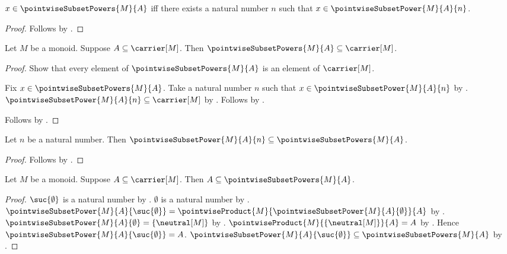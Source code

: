 \begin{proposition}\label{pointwise_subset_powers_iff}
    $x\in\pointwiseSubsetPowers{M}{A}$ iff there exists a natural number
        $n$ such that $x\in\pointwiseSubsetPower{M}{A}{n}$.
\end{proposition}
\begin{proof}
    Follows by .
\end{proof}

\begin{proposition}\label{pointwise_subset_powers_type}
    Let $M$ be a monoid.
    Suppose $A\subseteq\carrier[M]$.
    Then $\pointwiseSubsetPowers{M}{A}\subseteq\carrier[M]$.
\end{proposition}
\begin{proof}
    Show that every element of $\pointwiseSubsetPowers{M}{A}$ is an element
        of $\carrier[M]$.
    \begin{subproof}
        Fix $x\in\pointwiseSubsetPowers{M}{A}$.
        Take a natural number $n$ such that
            $x\in\pointwiseSubsetPower{M}{A}{n}$ by
            .
        $\pointwiseSubsetPower{M}{A}{n}\subseteq\carrier[M]$ by
            .
        Follows by .
    \end{subproof}
    Follows by .
\end{proof}

\begin{proposition}\label{pointwise_subset_power_subseteq_powers}
    Let $n$ be a natural number.
    Then $\pointwiseSubsetPower{M}{A}{n}
        \subseteq\pointwiseSubsetPowers{M}{A}$.
\end{proposition}
\begin{proof}
    Follows by .
\end{proof}

\begin{proposition}\label{subseteq_pointwise_subset_powers}
    Let $M$ be a monoid.
    Suppose $A\subseteq\carrier[M]$.
    Then $A\subseteq\pointwiseSubsetPowers{M}{A}$.
\end{proposition}
\begin{proof}
    $\suc{\emptyset}$ is a natural number by
        .
    $\emptyset$ is a natural number by .
    $\pointwiseSubsetPower{M}{A}{\suc{\emptyset}}
        =\pointwiseProduct{M}{
            \pointwiseSubsetPower{M}{A}{\emptyset}}{A}$ by
        .
    $\pointwiseSubsetPower{M}{A}{\emptyset}=\{\neutral[M]\}$ by
        .
    $\pointwiseProduct{M}{\{\neutral[M]\}}{A}=A$ by
        .
    Hence $\pointwiseSubsetPower{M}{A}{\suc{\emptyset}}=A$.
    $\pointwiseSubsetPower{M}{A}{\suc{\emptyset}}
        \subseteq\pointwiseSubsetPowers{M}{A}$ by
        .
\end{proof}

